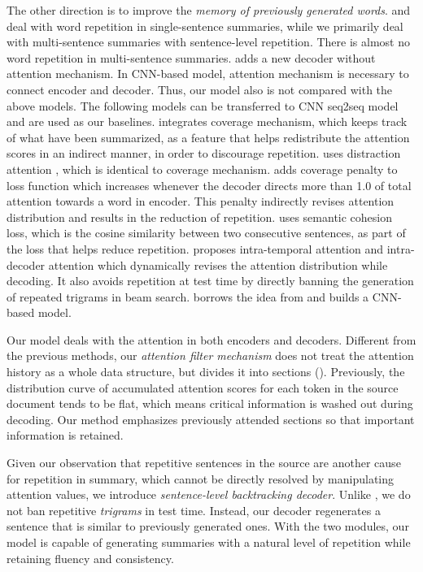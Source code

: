 The other direction is to improve the 
{\em memory of previously generated words}.
\cite{SuzukiN17} and \cite{LinSMS18} 
deal with word repetition in single-sentence summaries, 
while we primarily deal with multi-sentence summaries with 
sentence-level repetition. 
There is almost no word repetition in multi-sentence summaries.
\cite{JiangB18} adds a new decoder without attention mechanism.
In CNN-based model, attention mechanism is necessary to connect encoder 
and decoder.
Thus, our model also is not compared with the above models. 
The following models can be transferred to CNN seq2seq model and
are used as our baselines.
\cite{SeeLM17} integrates coverage mechanism, 
which keeps track of what have been summarized, as a feature that helps 
redistribute the attention scores in an indirect manner,
in order to discourage repetition. 
\cite{TanWX17} uses distraction attention
\citep{ChenZLWJ16}, which is identical to coverage mechanism. 
\cite{GehrmannDR18} adds coverage penalty to loss function
which increases whenever the decoder directs more than 1.0 of total attention
towards a word in encoder.
This penalty indirectly revises attention distribution and results in
the reduction of repetition.
\cite{elikyilmazBHC18} uses semantic cohesion loss,
which is the cosine similarity between two consecutive sentences, as part of
the loss that helps reduce repetition.
\cite{PaulusXS17} proposes intra-temporal attention \citep{NallapatiZSGX16} and 
intra-decoder attention which dynamically revises the attention distribution while decoding. 
It also avoids repetition at test time by directly banning the generation of 
repeated trigrams in beam search. 
\cite{FanGA18} borrows the idea from \cite{PaulusXS17} and 
builds a CNN-based model. 

Our model deals with the attention in both encoders and decoders. 
Different from the previous methods, 
our \textit{attention filter mechanism} does not 
treat the attention history as a whole data structure,  
but divides it into sections (). 
Previously, the distribution curve of accumulated attention scores 
for each token in the source document tends to be flat, 
which means critical information is washed out during decoding.
Our method emphasizes previously attended sections 
so that important information is retained.

Given our observation that repetitive sentences in the source are
another cause for repetition in summary, 
which cannot be directly resolved by manipulating attention values, 
we introduce \textit{sentence-level backtracking decoder}. 
Unlike \cite{PaulusXS17}, 
we do not ban repetitive \textit{trigrams} in test time. 
Instead, our decoder regenerates a sentence that is similar to previously generated ones.
With the two modules, our model is capable of generating summaries with a
natural level of repetition while retaining fluency and consistency.

